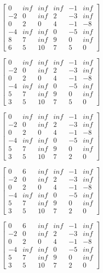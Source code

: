 \documentclass{article}
\begin{document}
$ \begin{bmatrix}
0   & inf & inf & inf & -1 & inf      \\
-2  & 0   & inf & 2  & -3 & inf \\
0   & 2   & 0   & 4  & -1 & -8  \\
-4  & inf & inf & 0  & -5 & inf \\
8   & 7   & inf & 9  & 0  & inf \\
6   & 5   & 10  & 7  & 5  & 0
\end{bmatrix}  $


$ \begin{bmatrix}
0   & inf & inf & inf & -1 & inf      \\
-2  & 0   & inf & 2  & -3 & inf \\
0   & 2   & 0   & 4  & -1 & -8  \\
-4  & inf & inf & 0  & -5 & inf \\
5   & 7   & inf & 9  & 0  & inf \\
3   & 5   & 10  & 7  & 5  & 0
\end{bmatrix}  $


$ \begin{bmatrix}
0   & inf & inf & inf & -1 & inf      \\
-2  & 0   & inf & 2  & -3 & inf \\
0   & 2   & 0   & 4  & -1 & -8  \\
-4  & inf & inf & 0  & -5 & inf \\
5   & 7   & inf & 9  & 0  & inf \\
3   & 5   & 10  & 7  & 2  & 0
\end{bmatrix}  $


$ \begin{bmatrix}
0   & 6 & inf & inf & -1 & inf      \\
-2  & 0   & inf & 2  & -3 & inf \\
0   & 2   & 0   & 4  & -1 & -8  \\
-4  & inf & inf & 0  & -5 & inf \\
5   & 7   & inf & 9  & 0  & inf \\
3   & 5   & 10  & 7  & 2  & 0
\end{bmatrix}  $

$ \begin{bmatrix}
0   & 6 & inf & inf & -1 & inf      \\
-2  & 0   & inf & 2  & -3 & inf \\
0   & 2   & 0   & 4  & -1 & -8  \\
-4  & inf & inf & 0  & -5 & inf \\
5   & 7   & inf & 9  & 0  & inf \\
3   & 5   & 10  & 7  & 2  & 0
\end{bmatrix}  $
\end{document}
